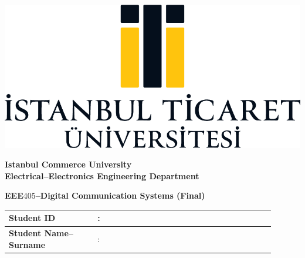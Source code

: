 \documentclass[a4paper, 11pt]{article}
\begin{document}
	\boldmath
	\thispagestyle{empty}
	\begin{minipage}[c]{\textwidth}
		\begin{minipage}[c]{0.3\textwidth}
			\centering
			\includegraphics[width=\textwidth]{logo.png}
		\end{minipage}%
		\begin{minipage}[c]{0.7\textwidth}
			\centering
			{\LARGE \textbf{Istanbul Commerce University}}\\[1em]
			{\Large \textbf{Electrical--Electronics Engineering Department}}
		\end{minipage}
	\end{minipage}
	
	\begin{center}
		\Large
		\textbf{EEE$405$--Digital Communication Systems (Final)}
	\end{center}
	
	\begin{table}[!ht]
		\renewcommand{\arraystretch}{2}
		\centering
		\begin{tabular}{@{}|L{0.3\linewidth} C{0.05\linewidth} p{0.55\linewidth}|@{}}
			\hline
			\textbf{Student ID}& : & ~ \\ \hline
			\textbf{Student Name--Surname}  & : & ~ \\ \hline
		\end{tabular}
	\end{table}
	
\end{document}
